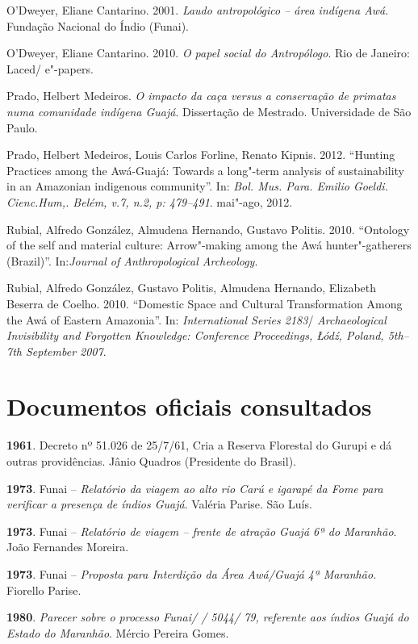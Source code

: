 \begin{Parskip}
O'Dweyer, Eliane Cantarino. 2001. \emph{Laudo antropológico -- área
indígena Awá}. Fundação Nacional do Índio (Funai).

O'Dweyer, Eliane Cantarino. 2010. \emph{O papel social do Antropólogo}.
Rio de Janeiro: Laced/ e"-papers.

Prado, Helbert Medeiros. \emph{O impacto da caça versus a conservação de
primatas numa comunidade indígena Guajá}. Dissertação de Mestrado.
Universidade de São Paulo.

Prado, Helbert Medeiros, Louis Carlos Forline, Renato Kipnis. 2012.
``Hunting Practices among the Awá-Guajá: Towards a long"-term analysis of
sustainability in an Amazonian indigenous community''. In: \emph{Bol. Mus.
Para. Emilio Goeldi. Cienc.Hum,. Belém, v.7, n.2, p: 479--491}. mai"-ago,
2012.

Rubial, Alfredo González, Almudena Hernando, Gustavo Politis. 2010.
``Ontology of the self and material culture: Arrow"-making among the Awá
hunter"-gatherers (Brazil)''. In:\emph{Journal of Anthropological
Archeology}.

Rubial, Alfredo González, Gustavo Politis, Almudena Hernando, Elizabeth
Beserra de Coelho. 2010. ``Domestic Space and Cultural Transformation
Among the Awá of Eastern Amazonia''. In: \emph{ International Series
2183}/ \emph{Archaeological Invisibility and Forgotten Knowledge:
Conference Proceedings, Łódź, Poland, 5th--7th September 2007}.

\section{Documentos oficiais consultados}

\textbf{1961}. Decreto nº 51.026 de 25/7/61, Cria a Reserva Florestal do
Gurupi e dá outras providências. Jânio Quadros (Presidente do Brasil).

\textbf{1973}. Funai -- \emph{Relatório da viagem ao alto rio Carú e
igarapé da Fome para verificar a presença de índios Guajá}. Valéria
Parise. São Luís.

\textbf{1973}. Funai -- \emph{Relatório de viagem -- frente de atração
Guajá 6ª do Maranhão}. João Fernandes Moreira.

\textbf{1973}. Funai -- \emph{Proposta para Interdição da Área Awá/Guajá
4ª  Maranhão.} Fiorello Parise.

\textbf{1980}. \emph{Parecer sobre o processo Funai/ / 5044/ 79,
referente aos índios Guajá do Estado do Maranhão}. Mércio Pereira Gomes.


\end{Parskip}
